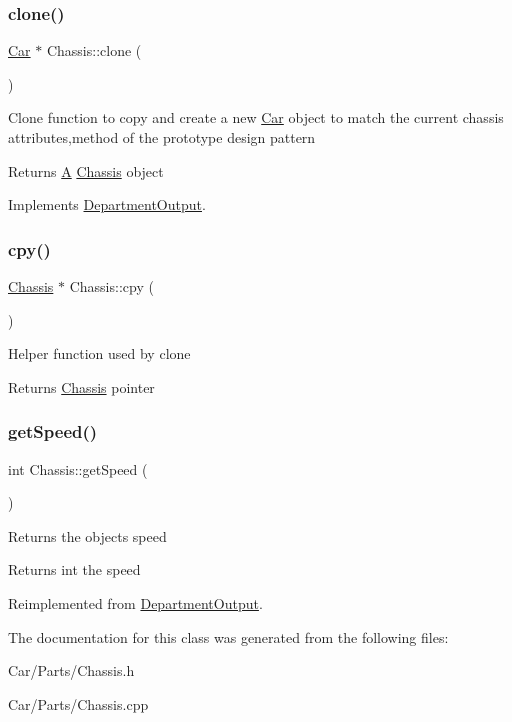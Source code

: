 \subsubsection{\texorpdfstring{clone()}{clone()}}
{\footnotesize\ttfamily \hyperlink{classCar}{Car} $\ast$ Chassis\+::clone (\begin{DoxyParamCaption}{ }\end{DoxyParamCaption})\hspace{0.3cm}{\ttfamily [virtual]}}

Clone function to copy and create a new \hyperlink{classCar}{Car} object to match the current chassis attributes,method of the prototype design pattern \begin{DoxyReturn}{Returns}
\hyperlink{classA}{A} \hyperlink{classChassis}{Chassis} object 
\end{DoxyReturn}


Implements \hyperlink{classDepartmentOutput_ab20c9d559bca6ce8e6748dfac47c3f84}{Department\+Output}.

\mbox{\label{classChassis_a75bfca11337766c0dda9544f27987d18}} 
\subsubsection{\texorpdfstring{cpy()}{cpy()}}
{\footnotesize\ttfamily \hyperlink{classChassis}{Chassis} $\ast$ Chassis\+::cpy (\begin{DoxyParamCaption}{ }\end{DoxyParamCaption})}

Helper function used by clone \begin{DoxyReturn}{Returns}
\hyperlink{classChassis}{Chassis} pointer 
\end{DoxyReturn}
\mbox{\label{classChassis_a095c63aa079ebd8d7fc04f238fd1e56c}} 
\subsubsection{\texorpdfstring{get\+Speed()}{getSpeed()}}
{\footnotesize\ttfamily int Chassis\+::get\+Speed (\begin{DoxyParamCaption}{ }\end{DoxyParamCaption})\hspace{0.3cm}{\ttfamily [virtual]}}

Returns the objects speed \begin{DoxyReturn}{Returns}
int the speed 
\end{DoxyReturn}


Reimplemented from \hyperlink{classDepartmentOutput_a90caf8934a687d18b9855f19a421ecef}{Department\+Output}.



The documentation for this class was generated from the following files\+:\begin{DoxyCompactItemize}
\item 
Car/\+Parts/Chassis.\+h\item 
Car/\+Parts/Chassis.\+cpp\end{DoxyCompactItemize}
